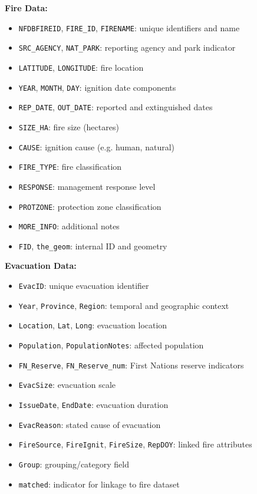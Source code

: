 \textbf{Fire Data:}\cite{cnfdb}
\begin{itemize}
    \item \texttt{NFDBFIREID}, \texttt{FIRE\_ID}, \texttt{FIRENAME}: unique identifiers and name
    \item \texttt{SRC\_AGENCY}, \texttt{NAT\_PARK}: reporting agency and park indicator
    \item \texttt{LATITUDE}, \texttt{LONGITUDE}: fire location
    \item \texttt{YEAR}, \texttt{MONTH}, \texttt{DAY}: ignition date components
    \item \texttt{REP\_DATE}, \texttt{OUT\_DATE}: reported and extinguished dates
    \item \texttt{SIZE\_HA}: fire size (hectares)
    \item \texttt{CAUSE}: ignition cause (e.g. human, natural)
    \item \texttt{FIRE\_TYPE}: fire classification
    \item \texttt{RESPONSE}: management response level
    \item \texttt{PROTZONE}: protection zone classification
    \item \texttt{MORE\_INFO}: additional notes
    \item \texttt{FID}, \texttt{the\_geom}: internal ID and geometry
\end{itemize}

\textbf{Evacuation Data:}\cite{evacdb}
\begin{itemize}
    \item \texttt{EvacID}: unique evacuation identifier
    \item \texttt{Year}, \texttt{Province}, \texttt{Region}: temporal and geographic context
    \item \texttt{Location}, \texttt{Lat}, \texttt{Long}: evacuation location
    \item \texttt{Population}, \texttt{PopulationNotes}: affected population
    \item \texttt{FN\_Reserve}, \texttt{FN\_Reserve\_num}: First Nations reserve indicators
    \item \texttt{EvacSize}: evacuation scale
    \item \texttt{IssueDate}, \texttt{EndDate}: evacuation duration
    \item \texttt{EvacReason}: stated cause of evacuation
    \item \texttt{FireSource}, \texttt{FireIgnit}, \texttt{FireSize}, \texttt{RepDOY}: linked fire attributes
    \item \texttt{Group}: grouping/category field
    \item \texttt{matched}: indicator for linkage to fire dataset
\end{itemize}

